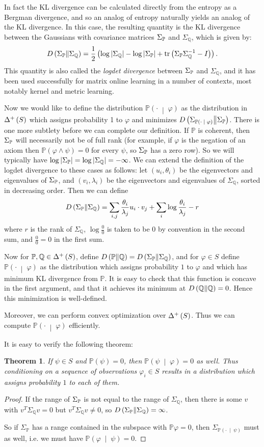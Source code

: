 \documentclass[12pt]{article}
\newtheorem{theorem}{Theorem}
\theoremstyle{definition}
\newcommand{\tr}[1]{\text{tr}\of{#1}}
\newcommand{\QQ}{\mathbb{Q}}
\newcommand{\of}[1]{\left(#1\right)}
\newcommand{\ofc}[2]{\left(#1\;\middle\vert\;#2\right)}
\newcommand{\PP}{\mathbb{P}}
\newcommand{\Pc}[2]{\PP\ofc{#1}{#2}}
\renewcommand{\P}[1]{\mathbb{P}\of{#1}}
\newcommand{\vp}{\varphi}
\newcommand{\abs}[1]{\left\vert#1\right\vert}
\begin{document}
In fact the KL divergence can be calculated directly from the entropy
as a Bergman divergence, %
and so an analog of entropy naturally yields
an analog of the KL divergence.
In this case, the resulting quantity
is the KL divergence between the Gaussians with 
covariance matrices $\SP$ and $\Sigma_{\QQ}$, which is given by:
\[ \KL{\Sigma_{\PP}}{\Sigma_{\QQ}} = \frac 12 \of{\log \abs{\Sigma_{\QQ}} - \log \abs{\Sigma_{\PP}} + \tr{ \SP \Sigma_{\QQ}^{-1} - I }}. \]
This quantity is also called the \emph{logdet divergence} between $\SP$ and $\Sigma_{\QQ}$,
and it has been used successfully for matrix online learning in a number of contexts,
most notably kernel and metric learning. %

Now we would like to define the distribution $\Pc{\cdot}{\vp}$ as the distribution
in $\Dp{S}$
which assigns probability 1 to $\vp$
and minimizes $\KL{\Sigma_{\Pc{\cdot}{\vp}}}{\Sigma_{\PP}}$.
There is one more subtlety before we can complete our definition.
If $\PP$ is coherent, then $\SP$ will necessarily not be of full rank
(for example, if $\vp$ is the negation of an axiom then $\P{\vp \wedge \psi} = 0$
for every $\psi$, so $\SP$ has a zero row).
So we will typically have $\log \abs{\SP} = \log \abs{\Sigma_{\QQ}} = -\infty$.
We can extend the definition of the logdet divergence to these cases as follows:
let $(u_i, \theta_i)$ be the eigenvectors and eigenvalues of $\SP$,
and $(v_i, \lambda_i)$ be the eigenvectors and eigenvalues of $\Sigma_{\QQ}$,
sorted in decreasing order.
Then we can define
\[ \KL{\SP}{\Sigma_{\QQ}} = \sum_{i, j}{ \frac {\theta_i}{\lambda_j} u_i \cdot v_j } + \sum_i \log \frac {\theta_i}{\lambda_j} - r\]
where $r$ is the rank of $\Sigma_{\QQ}$, $\log \frac 00$ is taken to be $0$ by convention in the second sum,
and $\frac 00 = 0$ in the first sum.

Now for $\PP, \QQ \in \Dp{S}$, define $\KL{\PP}{\QQ} = \KL{\SP}{\Sigma_{\QQ}}$,
and for $\vp \in S$ define $\Pc{\cdot}{\vp}$ as the distribution which assigns probability $1$ to $\vp$
and which has minimum KL divergence from $\PP$.
It is easy to check that this function is concave in the first argument,
and that it achieves its minimum at $\KL{\QQ}{\QQ} = 0$.
Hence this minimization is well-defined.

Moreover, we can
perform convex optimization over $\Dp{S}$.
Thus we can compute $\Pc{\cdot}{\vp}$ efficiently.

It is easy to verify the following theorem:
\begin{theorem}
If $\psi \in S$ and $\P{\psi} = 0$, then $\Pc{\psi}{\vp} = 0$ as well.
Thus conditioning on a sequence of observations $\vp_i \in S$ results
in a distribution which assigns probability $1$ to each of them.
\end{theorem}
\begin{proof}
If the range of $\SP$ is not equal to the range of $\Sigma_{\QQ}$,
then there is some $v$ with $v^T \Sigma_{\QQ} v = 0$
but $v^T \Sigma_{\QQ} v \neq 0$, so 
$\KL{\SP}{\Sigma_{\QQ}} = \infty$.

So if $\Sigma_{\PP}$ has a range contained in the subspace with $\PP{\vp} = 0$,
then $\Sigma_{\Pc{\cdot}{\psi}}$ must as well,
i.e. we must have $\Pc{\vp}{\psi} = 0$.
\end{proof}
\end{document}
